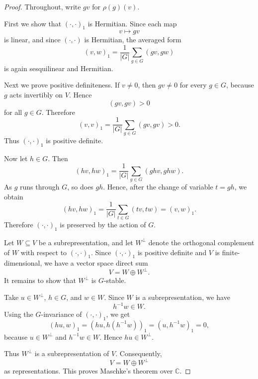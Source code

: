     \begin{proof}
        Throughout, write \(gv\) for \(\rho(g)(v)\).
        
        First we show that \((\cdot,\cdot)_1\) is Hermitian. Since each map
        \[
            v \longmapsto gv
        \]
        is linear, and since \((\cdot,\cdot)\) is Hermitian, the averaged form
        \[
            (v,w)_1
            =
            \frac{1}{|G|}
            \sum_{g\in G}(gv,gw)
        \]
        is again sesquilinear and Hermitian.
        
        Next we prove positive definiteness. If \(v\neq 0\), then \(gv\neq 0\) for every
        \(g\in G\), because \(g\) acts invertibly on \(V\). Hence
        \[
            (gv,gv)>0
        \]
        for all \(g\in G\). Therefore
        \[
            (v,v)_1
            =
            \frac{1}{|G|}
            \sum_{g\in G}(gv,gv)
            >0.
        \]
        Thus \((\cdot,\cdot)_1\) is positive definite.
        
        Now let \(h\in G\). Then
        \[
            (hv,hw)_1
            =
            \frac{1}{|G|}
            \sum_{g\in G}(ghv,ghw).
        \]
        As \(g\) runs through \(G\), so does \(gh\). Hence, after the change of variable
        \(t=gh\), we obtain
        \[
            (hv,hw)_1
            =
            \frac{1}{|G|}
            \sum_{t\in G}(tv,tw)
            =
            (v,w)_1.
        \]
        Therefore \((\cdot,\cdot)_1\) is preserved by the action of \(G\).
        
        Let \(W\subseteq V\) be a subrepresentation, and let \(W^\perp\) denote the
        orthogonal complement of \(W\) with respect to \((\cdot,\cdot)_1\). Since
        \((\cdot,\cdot)_1\) is positive definite and \(V\) is finite-dimensional, we have
        a vector space direct sum
        \[
            V = W \oplus W^\perp.
        \]
        It remains to show that \(W^\perp\) is \(G\)-stable.
        
        Take \(u\in W^\perp\), \(h\in G\), and \(w\in W\). Since \(W\) is a subrepresentation,
        we have
        \[
            h^{-1}w\in W.
        \]
        Using the \(G\)-invariance of \((\cdot,\cdot)_1\), we get
        \[
            (hu,w)_1
            =
            (hu,h(h^{-1}w))_1
            =
            (u,h^{-1}w)_1
            =
            0,
        \]
        because \(u\in W^\perp\) and \(h^{-1}w\in W\). Hence \(hu\in W^\perp\).
        
        Thus \(W^\perp\) is a subrepresentation of \(V\). Consequently,
        \[
            V = W \oplus W^\perp
        \]
        as representations. This proves Maschke's theorem over \(\mathbb{C}\).
        \end{proof}

